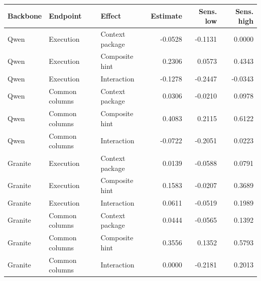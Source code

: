 \begin{tabular}{lllrrr}
\toprule
Backbone & Endpoint & Effect & Estimate & Sens. low & Sens. high \\
\midrule
Qwen & Execution & Context package & -0.0528 & -0.1131 & 0.0000 \\
Qwen & Execution & Composite hint & 0.2306 & 0.0573 & 0.4343 \\
Qwen & Execution & Interaction & -0.1278 & -0.2447 & -0.0343 \\
Qwen & Common columns & Context package & 0.0306 & -0.0210 & 0.0978 \\
Qwen & Common columns & Composite hint & 0.4083 & 0.2115 & 0.6122 \\
Qwen & Common columns & Interaction & -0.0722 & -0.2051 & 0.0223 \\
Granite & Execution & Context package & 0.0139 & -0.0588 & 0.0791 \\
Granite & Execution & Composite hint & 0.1583 & -0.0207 & 0.3689 \\
Granite & Execution & Interaction & 0.0611 & -0.0519 & 0.1989 \\
Granite & Common columns & Context package & 0.0444 & -0.0565 & 0.1392 \\
Granite & Common columns & Composite hint & 0.3556 & 0.1352 & 0.5793 \\
Granite & Common columns & Interaction & 0.0000 & -0.2181 & 0.2013 \\
\bottomrule
\end{tabular}
